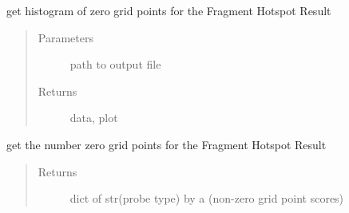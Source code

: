 \documentclass[letterpaper,10pt,english]{sphinxmanual}
\begin{document}
\begin{fulllineitems}
\begin{fulllineitems}
\begin{quote}
\begin{description}
\end{description}\end{quote}

\end{fulllineitems}


\begin{fulllineitems}
\label{\detokenize{result_api:hotspots.result.Results.histogram}}
get histogram of zero grid points for the Fragment Hotspot Result
\begin{quote}\begin{description}
\item[{Parameters}] \leavevmode
{} \textendash{} path to output file

\item[{Returns}] \leavevmode
data, plot

\end{description}\end{quote}

\begin{sphinxVerbatim}[commandchars=\\\{\}]
  
\end{sphinxVerbatim}

\end{fulllineitems}


\begin{fulllineitems}
\label{\detokenize{result_api:hotspots.result.Results.map_values}}
get the number zero grid points for the Fragment Hotspot Result
\begin{quote}\begin{description}
\item[{Returns}] \leavevmode
dict of str(probe type) by a  (non-zero grid point scores)


\end{description}
\end{quote}
\end{fulllineitems}
\end{fulllineitems}
\end{document}
